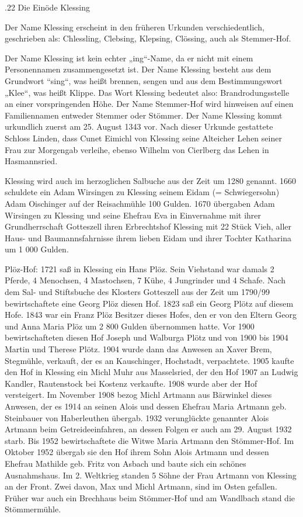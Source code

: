\documentclass{book}
\begin{document}
.22 Die Einöde Klessing

Der Name Klessing erscheint in den früheren Urkunden verschiedentlich,
geschrieben als: Chlessling, Clebsing, Klepsing, Clössing, auch als Stemmer-Hof.

Der Name Klessing ist kein echter „ing“-Name, da er nicht mit einem
Personennamen zusammengesetzt ist. Der Name Klessing besteht aus dem Grundwort
“sing“, was heißt brennen, sengen und aus dem Bestimmungswort „Klee“, was heißt
Klippe. Das Wort Klessing bedeutet also: Brandrodungsstelle an einer
vorspringenden Höhe. Der Name Stemmer-Hof wird hinweisen auf einen Familiennamen
entweder Stemmer oder Stömmer. Der Name Klessing kommt urkundlich zuerst am 25.
August 1343 vor. Nach dieser Urkunde gestattete Schloss Linden, dass Cunet
Eimichl von Klessing seine Alteicher Lehen seiner Frau zur Morgengab verleihe,
ebenso Wilhelm von Cierlberg das Lehen in Hasmannsried.

Klessing wird auch im herzoglichen Salbuche aus der Zeit um 1280 genannt. 1660
schuldete ein Adam Wirsingen zu Klessing seinem Eidam (= Schwiegersohn) Adam
Oischinger auf der Reisachmühle 100 Gulden. 1670 übergaben Adam Wirsingen zu
Klessing und seine Ehefrau Eva in Einvernahme mit ihrer Grundherrschaft
Gotteszell ihren Erbrechtshof Klessing mit 22 Stück Vieh, aller Haus- und
Baumannsfahrnisse ihrem lieben Eidam und ihrer Tochter Katharina um 1 000
Gulden.

Plöz-Hof: 1721 saß in Klessing ein Hans Plöz. Sein Viehstand war damals 2
Pferde, 4 Menochsen, 4 Mastochsen, 7 Kühe, 4 Jungrinder und 4 Schafe. Nach dem
Sal- und Stiftsbuche des Klosters Gotteszell aus der Zeit um 1790/99
bewirtschaftete eine Georg Plöz diesen Hof. 1823 saß ein Georg Plötz auf diesem
Hofe. 1843 war ein Franz Plöz Besitzer dieses Hofes, den er von den Eltern Georg
und Anna Maria Plöz um 2 800 Gulden übernommen hatte. Vor 1900 bewirtschafteten
diesen Hof Joseph und Walburga Plötz und von 1900 bis 1904 Martin und Therese
Plötz. 1904 wurde dann das Anwesen an Xaver Brem, Stegmühle, verkauft, der es an
Kauschinger, Hochstadt, verpachtete. 1905 kaufte den Hof in Klessing ein Michl
Muhr aus Masselsried, der den Hof 1907 an Ludwig Kandler, Rautenstock bei
Kostenz verkaufte. 1908 wurde aber der Hof versteigert. Im November 1908 bezog
Michl Artmann aus Bärwinkel dieses Anwesen, der es 1914 an seinen Alois und
dessen Ehefrau Maria Artmann geb. Steinbauer von Haberleuthen übergab. 1932
verunglückte genannter Alois Artmann beim Getreideeinfahren, an dessen Folgen er
auch am 29. August 1932 starb. Bis 1952 bewirtschaftete die Witwe Maria Artmann
den Stömmer-Hof. Im Oktober 1952 übergab sie den Hof ihrem Sohn Alois Artmann
und dessen Ehefrau Mathilde geb. Fritz von Asbach und baute sich ein schönes
Ausnahmshaus. Im 2. Weltkrieg standen 5 Söhne der Frau Artmann von Klessing an
der Front. Zwei davon, Max und Michl Artmann, sind im Osten gefallen. Früher war
auch ein Brechhaus beim Stömmer-Hof und am Wandlbach stand die Stömmermühle.
\end{document}
